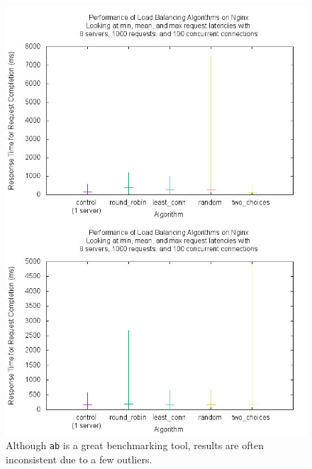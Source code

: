 \begin{figure}
  \includegraphics[width=\linewidth]{figures/ab/stats/100/stats-8.jpg}
  \caption{Although \texttt{ab} is a great benchmarking tool, results
    are often inconsistent due to a few outliers.}
\label{fig:nginx8}
\end{figure}

